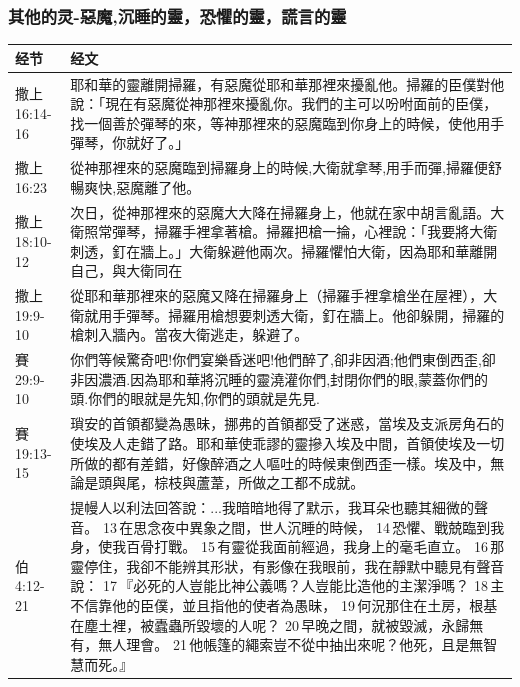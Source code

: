 \subsubsection{其他的灵-惡魔,沉睡的靈，恐懼的靈，謊言的靈}
\begin{table}[H]
\centering
\begin{tabular}{p{6em}p{42em}}  \toprule
经节&经文 \\  \midrule
撒上16:14-16&耶和華的靈離開掃羅，有惡魔從耶和華那裡來擾亂他。掃羅的臣僕對他說：「現在有惡魔從神那裡來擾亂你。我們的主可以吩咐面前的臣僕，找一個善於彈琴的來，等神那裡來的惡魔臨到你身上的時候，使他用手彈琴，你就好了。」 \\  \midrule

撒上16:23&從神那裡來的惡魔臨到掃羅身上的時候,大衛就拿琴,用手而彈,掃羅便舒暢爽快,惡魔離了他。 \\  \midrule

撒上18:10-12&次日，從神那裡來的惡魔大大降在掃羅身上，他就在家中胡言亂語。大衛照常彈琴，掃羅手裡拿著槍。掃羅把槍一掄，心裡說：「我要將大衛刺透，釘在牆上。」大衛躲避他兩次。掃羅懼怕大衛，因為耶和華離開自己，與大衛同在\\  \midrule

撒上19:9-10&從耶和華那裡來的惡魔又降在掃羅身上（掃羅手裡拿槍坐在屋裡），大衛就用手彈琴。掃羅用槍想要刺透大衛，釘在牆上。他卻躲開，掃羅的槍刺入牆內。當夜大衛逃走，躲避了。 \\  \midrule


賽29:9-10&你們等候驚奇吧!你們宴樂昏迷吧!他們醉了,卻非因酒;他們東倒西歪,卻非因濃酒.因為耶和華將沉睡的靈澆灌你們,封閉你們的眼,蒙蓋你們的頭.你們的眼就是先知,你們的頭就是先見.\\  \midrule
賽19:13-15&瑣安的首領都變為愚昧，挪弗的首領都受了迷惑，當埃及支派房角石的使埃及人走錯了路。耶和華使乖謬的靈摻入埃及中間，首領使埃及一切所做的都有差錯，好像醉酒之人嘔吐的時候東倒西歪一樣。埃及中，無論是頭與尾，棕枝與蘆葦，所做之工都不成就。\\  \midrule
伯4:12-21&提幔人以利法回答說：...我暗暗地得了默示，我耳朵也聽其細微的聲音。 13 在思念夜中異象之間，世人沉睡的時候， 14 恐懼、戰兢臨到我身，使我百骨打戰。 15 有靈從我面前經過，我身上的毫毛直立。 16 那靈停住，我卻不能辨其形狀，有影像在我眼前，我在靜默中聽見有聲音說： 17 『必死的人豈能比神公義嗎？人豈能比造他的主潔淨嗎？ 18 主不信靠他的臣僕，並且指他的使者為愚昧， 19 何況那住在土房，根基在塵土裡，被蠹蟲所毀壞的人呢？ 20 早晚之間，就被毀滅，永歸無有，無人理會。 21 他帳篷的繩索豈不從中抽出來呢？他死，且是無智慧而死。』\\  \midrule


\end{tabular}
\end{table}
